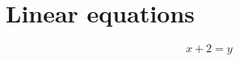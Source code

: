 \documentclass{article}
\begin{document}
\section{Linear equations}

\[
x + 2 = y
\]
\end{document}

